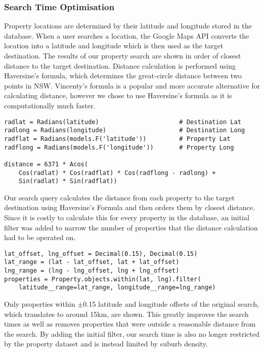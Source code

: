 \subsubsection{Search Time Optimisation}

Property locations are determined by their latitude and longitude stored in the
database. When a user searches a location, the Google Maps API converts the location
into a latitude and longitude which is then used as the target destination.
The results of our property search are shown in order of closest distance to the
target destination.
Distance calculation is performed using Haversine's formula, which determines the
great-circle distance between two points in NSW. Vincenty's formula is a popular and
more accurate alternative for calculating distance, however we chose to
use Haversine's formula as it is computationally much faster.

\begin{lstlisting}[caption={Haversine's Formula}]
radlat = Radians(latitude)                      # Destination Lat
radlong = Radians(longitude)                    # Destination Long
radflat = Radians(models.F('latitude'))	        # Property Lat
radflong = Radians(models.F('longitude'))       # Property Long

distance = 6371 * Acos(
    Cos(radlat) * Cos(radflat) * Cos(radflong - radlong) +
    Sin(radlat) * Sin(radflat))
\end{lstlisting}

Our search query calculates the distance from each property to the target
destination using Haversine's Formula and then orders them by closest distance.
Since it is costly to calculate this for every property in the database, an
initial filter was added to narrow the number of properties that the
distance calculation had to be operated on.

\begin{lstlisting}[caption={Initial filter to narrow search results}]
lat_offset, lng_offset = Decimal(0.15), Decimal(0.15)
lat_range = (lat - lat_offset, lat + lat_offset)
lng_range = (lng - lng_offset, lng + lng_offset)
properties = Property.objects.within(lat, lng).filter(
    latitude__range=lat_range, longitude__range=lng_range)
\end{lstlisting}

Only properties within $\pm$0.15 latitude and longitude offsets of the original
search, which translates to around 15km, are shown. This greatly improves the
search times as well as removes properties that were outside a reasonable distance
from the search. By adding the initial filter, our search time is also no longer
restricted by the property dataset and is instead limited by suburb density.


